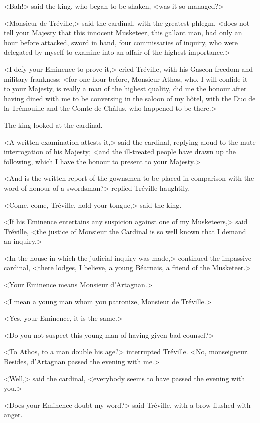 <Bah!> said the king, who began to be shaken, <was it so managed?> 

<Monsieur de Tréville,> said the cardinal, with the greatest phlegm, <does not tell your Majesty that this innocent Musketeer, this gallant man, had only an hour before attacked, sword in hand, four commissaries of inquiry, who were delegated by myself to examine into an affair of the highest importance.> 

<I defy your Eminence to prove it,> cried Tréville, with his Gascon freedom and military frankness; <for one hour before, Monsieur Athos, who, I will confide it to your Majesty, is really a man of the highest quality, did me the honour after having dined with me to be conversing in the saloon of my hôtel, with the Duc de la Trémouille and the Comte de Châlus, who happened to be there.> 

The king looked at the cardinal. 

<A written examination attests it,> said the cardinal, replying aloud to the mute interrogation of his Majesty; <and the ill-treated people have drawn up the following, which I have the honour to present to your Majesty.> 

<And is the written report of the gownsmen to be placed in comparison with the word of honour of a swordsman?> replied Tréville haughtily. 

<Come, come, Tréville, hold your tongue,> said the king. 

<If his Eminence entertains any suspicion against one of my Musketeers,> said Tréville, <the justice of Monsieur the Cardinal is so well known that I demand an inquiry.> 

<In the house in which the judicial inquiry was made,> continued the impassive cardinal, <there lodges, I believe, a young Béarnais, a friend of the Musketeer.> 

<Your Eminence means Monsieur d'Artagnan.> 

<I mean a young man whom you patronize, Monsieur de Tréville.> 

<Yes, your Eminence, it is the same.> 

<Do you not suspect this young man of having given bad counsel?> 

<To Athos, to a man double his age?> interrupted Tréville. <No, monseigneur. Besides, d'Artagnan passed the evening with me.> 

<Well,> said the cardinal, <everybody seems to have passed the evening with you.> 

<Does your Eminence doubt my word?> said Tréville, with a brow flushed with anger. 

